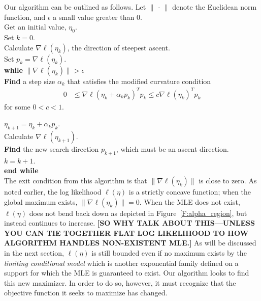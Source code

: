 Our algorithm can be outlined as follows.  Let $\lVert \, \cdot \, \rVert$ denote the 
Euclidean norm function, and $\epsilon$ 
a small value greater than 0.  \\

\noindent Get an initial value, $\eta_0$.\\ 
Set $k=0$. \\
Calculate $\nabla \ell( \eta_k)$, the direction of steepest ascent. \\
Set $p_k = \nabla \ell( \eta_k)$. \\
\textbf{while}  $\lVert \nabla \ell( \eta_k) \rVert > \epsilon$ \\ 
\hspace{4mm} \indent	 \textbf{Find} a step size $\alpha_k$ that satisfies the modified 
curvature condition
\begin{align*}
	 0 & \leq \nabla \ell( \eta_k + \alpha_k p_k)^T p_k \leq c \nabla \ell(\eta_k)^T 
p_k
\end{align*}
\indent for some $0 < c < 1$.  


$\eta_{k+1} = \eta_k + \alpha_k p_k$.\\
\indent Calculate $\nabla \ell( \eta_{k+1})$.\\
\indent \textbf{Find} the new search direction $p_{k+1}$, which must be an ascent 
direction. \\
\indent $k = k + 1$.  \\
\textbf{end while}\\

The exit condition from this algorithm is that $\lVert \nabla \ell( \eta_k) \rVert$
is close to zero.  As noted earlier, the log likelihood $\ell(\eta)$ is a strictly
concave function; when the global maximum exists, $\lVert \nabla \ell( \eta_k) \rVert = 0$.  When the MLE does not exist, $\ell(\eta)$ does not bend back down
as depicted in Figure~\ref{F:alpha_region}, but instead continues to increase.
\textbf{[SO WHY TALK ABOUT THIS---UNLESS YOU CAN TIE TOGETHER FLAT LOG LIKELIHOOD
TO HOW ALGORITHM HANDLES NON-EXISTENT MLE.]} 
As will be discussed in the next section, $\ell(\eta)$ is still bounded even if
no maximum exists by the \emph{limiting conditional model} which is another
exponential family defined on a support for which the MLE is
guaranteed to exist.
Our algorithm looks to find this new maximizer.  In order to do so, however, it must 
recognize that the objective function it seeks to maximize has changed.

